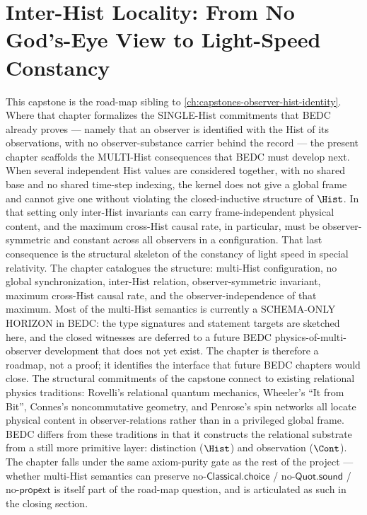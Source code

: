 \chapter{Inter-Hist Locality: From No God's-Eye View to Light-Speed Constancy}
\label{ch:capstones-inter-hist-locality}

This capstone is the road-map sibling to \autoref{ch:capstones-observer-hist-identity}. Where that chapter formalizes the SINGLE-Hist commitments that BEDC already proves --- namely that an observer is identified with the Hist of its observations, with no observer-substance carrier behind the record --- the present chapter scaffolds the MULTI-Hist consequences that BEDC must develop next. When several independent Hist values are considered together, with no shared base and no shared time-step indexing, the kernel does not give a global frame and cannot give one without violating the closed-inductive structure of \(\Hist\). In that setting only inter-Hist invariants can carry frame-independent physical content, and the maximum cross-Hist causal rate, in particular, must be observer-symmetric and constant across all observers in a configuration. That last consequence is the structural skeleton of the constancy of light speed in special relativity. The chapter catalogues the structure: multi-Hist configuration, no global synchronization, inter-Hist relation, observer-symmetric invariant, maximum cross-Hist causal rate, and the observer-independence of that maximum. Most of the multi-Hist semantics is currently a SCHEMA-ONLY HORIZON in BEDC: the type signatures and statement targets are sketched here, and the closed witnesses are deferred to a future BEDC physics-of-multi-observer development that does not yet exist. The chapter is therefore a roadmap, not a proof; it identifies the interface that future BEDC chapters would close. The structural commitments of the capstone connect to existing relational physics traditions: Rovelli's relational quantum mechanics, Wheeler's ``It from Bit'', Connes's noncommutative geometry, and Penrose's spin networks all locate physical content in observer-relations rather than in a privileged global frame. BEDC differs from these traditions in that it constructs the relational substrate from a still more primitive layer: distinction (\(\Hist\)) and observation (\(\Cont\)). The chapter falls under the same axiom-purity gate as the rest of the project --- whether multi-Hist semantics can preserve no-\(\mathsf{Classical.choice}\) / no-\(\mathsf{Quot.sound}\) / no-\(\mathsf{propext}\) is itself part of the road-map question, and is articulated as such in the closing section.

